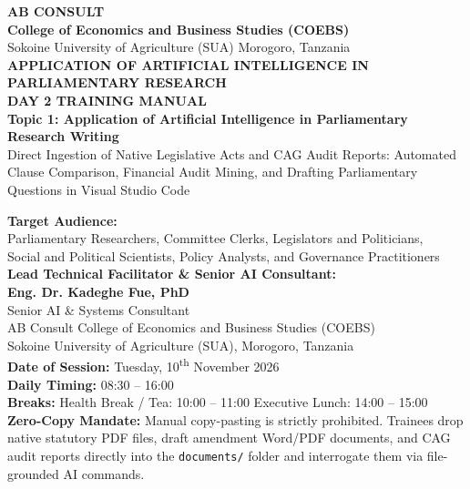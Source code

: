 \documentclass[11pt, a4paper]{report}
\begin{document}
\begin{titlepage}
    \centering
    \vspace*{0.5cm}
    
    {\LARGE \textbf{\textcolor{tanzaniablue}{AB CONSULT}}}\\[0.2cm]
    {\large \textbf{College of Economics and Business Studies (COEBS)}}\\[0.15cm]
    {\normalsize Sokoine University of Agriculture (SUA) \textbullet{} Morogoro, Tanzania}\\[1.2cm]
    
    {\LARGE \textbf{\textcolor{suagreen}{APPLICATION OF ARTIFICIAL INTELLIGENCE IN PARLIAMENTARY RESEARCH}}}\\[0.4cm]
    {\Huge \textbf{DAY 2 TRAINING MANUAL}}\\[0.4cm]
    {\Large \textbf{Topic 1: Application of Artificial Intelligence in Parliamentary Research Writing}}\\[0.25cm]
    {\large Direct Ingestion of Native Legislative Acts and CAG Audit Reports: Automated Clause Comparison, Financial Audit Mining, and Drafting Parliamentary Questions in Visual Studio Code}\\[1.2cm]
    
    \begin{minipage}{0.92\textwidth}
        \centering
        \textbf{Target Audience:}\\
        Parliamentary Researchers, Committee Clerks, Legislators and Politicians,\\
        Social and Political Scientists, Policy Analysts, and Governance Practitioners\\[0.6cm]
        
        \textbf{Lead Technical Facilitator \& Senior AI Consultant:}\\
        \textbf{\Large Eng. Dr. Kadeghe Fue, PhD}\\
        Senior AI \& Systems Consultant\\
        AB Consult \textbullet{} College of Economics and Business Studies (COEBS)\\
        Sokoine University of Agriculture (SUA), Morogoro, Tanzania\\[0.6cm]
        
        \textbf{Date of Session:} Tuesday, 10\textsuperscript{th} November 2026\\
        \textbf{Daily Timing:} 08:30 -- 16:00\\
        \textbf{Breaks:} Health Break / Tea: 10:00 -- 11:00 \textbar{} Executive Lunch: 14:00 -- 15:00\\
        \textbf{Zero-Copy Mandate:} Manual copy-pasting is strictly prohibited. Trainees drop native statutory PDF files, draft amendment Word/PDF documents, and CAG audit reports directly into the \texttt{documents/} folder and interrogate them via file-grounded AI commands.
    \end{minipage}
    

\end{titlepage}
\end{document}
